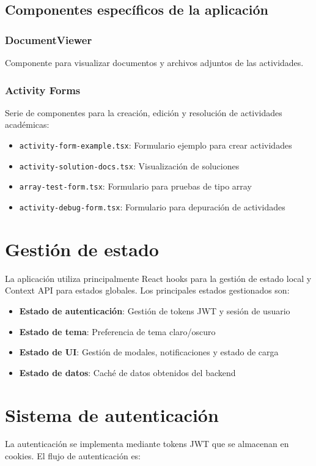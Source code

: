 \documentclass[12pt,a4paper]{report}
\begin{document}
\subsection{Componentes específicos de la aplicación}
\subsubsection{DocumentViewer}
Componente para visualizar documentos y archivos adjuntos de las actividades.

\subsubsection{Activity Forms}
Serie de componentes para la creación, edición y resolución de actividades académicas:
\begin{itemize}
    \item \texttt{activity-form-example.tsx}: Formulario ejemplo para crear actividades
    \item \texttt{activity-solution-docs.tsx}: Visualización de soluciones
    \item \texttt{array-test-form.tsx}: Formulario para pruebas de tipo array
    \item \texttt{activity-debug-form.tsx}: Formulario para depuración de actividades
\end{itemize}

\section{Gestión de estado}
La aplicación utiliza principalmente React hooks para la gestión de estado local y Context API para estados globales. Los principales estados gestionados son:

\begin{itemize}
    \item \textbf{Estado de autenticación}: Gestión de tokens JWT y sesión de usuario
    \item \textbf{Estado de tema}: Preferencia de tema claro/oscuro
    \item \textbf{Estado de UI}: Gestión de modales, notificaciones y estado de carga
    \item \textbf{Estado de datos}: Caché de datos obtenidos del backend
\end{itemize}

\section{Sistema de autenticación}
La autenticación se implementa mediante tokens JWT que se almacenan en cookies. El flujo de autenticación es:
\end{document}
